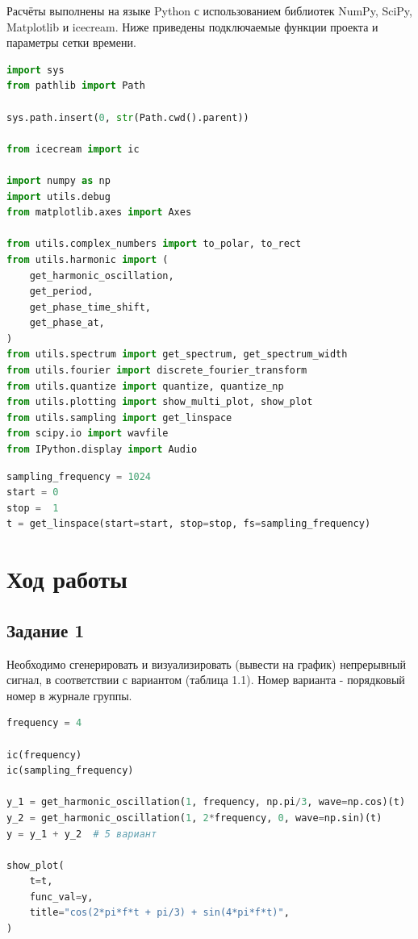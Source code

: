 \documentclass[a4paper,14pt,oneside,openany]{memoir}
\begin{document}
Расчёты выполнены на языке Python с использованием библиотек NumPy, SciPy, Matplotlib и icecream. Ниже приведены подключаемые функции проекта и параметры сетки времени.

\begin{lstlisting}[language=Python, caption={Подключение библиотек и функций проекта}]
import sys
from pathlib import Path

sys.path.insert(0, str(Path.cwd().parent))

from icecream import ic

import numpy as np
import utils.debug
from matplotlib.axes import Axes

from utils.complex_numbers import to_polar, to_rect
from utils.harmonic import (
    get_harmonic_oscillation,
    get_period,
    get_phase_time_shift,
    get_phase_at,
)
from utils.spectrum import get_spectrum, get_spectrum_width
from utils.fourier import discrete_fourier_transform
from utils.quantize import quantize, quantize_np
from utils.plotting import show_multi_plot, show_plot
from utils.sampling import get_linspace
from scipy.io import wavfile
from IPython.display import Audio
\end{lstlisting}

\begin{lstlisting}[language=Python, caption={Параметры времени и сетка отсчётов}]
sampling_frequency = 1024
start = 0
stop =  1
t = get_linspace(start=start, stop=stop, fs=sampling_frequency)
\end{lstlisting}


\section{Ход работы}

\subsection{Задание 1}

Необходимо сгенерировать и визуализировать (вывести на график) непрерывный сигнал, в соответствии с вариантом (таблица 1.1). Номер варианта - порядковый номер в журнале группы.

\begin{lstlisting}[language=Python, caption={Генерация и построение непрерывного сигнала}]
frequency = 4

ic(frequency)
ic(sampling_frequency)

y_1 = get_harmonic_oscillation(1, frequency, np.pi/3, wave=np.cos)(t)
y_2 = get_harmonic_oscillation(1, 2*frequency, 0, wave=np.sin)(t)
y = y_1 + y_2  # 5 вариант

show_plot(
    t=t,
    func_val=y,
    title="cos(2*pi*f*t + pi/3) + sin(4*pi*f*t)",
)
\end{lstlisting}
\end{document}
